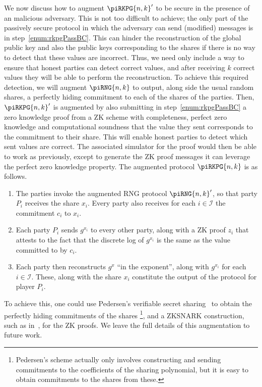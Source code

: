 \documentclass{article}
\theoremstyle{remark}
\begin{document}
We now discuss how to augment ${\piRKPG{n,k}}'$ to be secure in the presence of
an malicious adversary. This is not too difficult to achieve; the only part of
the passively secure protocol in which the adversary can send (modified)
messages is in step~\ref{enum:rkpgPassBC}. This can hinder the reconstruction
of the global public key and also the public keys corresponding to the shares
if there is no way to detect that these values are incorrect. Thus, we need
only include a way to ensure that honest parties can detect correct values, and
after receiving $k$ correct values they will be able to perform the
reconstruction.  To achieve this required detection, we will augment
$\piRNG{n,k}$ to output, along side the usual random shares, a perfectly hiding
commitment to each of the shares of the parties. Then, ${\piRKPG{n,k}}'$ is
augmented by also submitting in step~\ref{enum:rkpgPassBC} a zero knowledge
proof from a ZK scheme with completeness, perfect zero knowledge and
computational soundness that the value they sent corresponds to the commitment
to their share. This will enable honest parties to detect which sent values are
correct. The associated simulator for the proof would then be able to work as
previously, except to generate the ZK proof messages it can leverage the
perfect zero knowledge property. The augmented protocol $\piRKPG{n,k}$ is as
follows.

\begin{enumerate}
	\item The parties invoke the augmented RNG protocol ${\piRNG{n,k}}'$, so
		that party $P_i$ receives the share $x_i$. Every party also receives
		for each $i \in \mathcal{I}$ the commitment $c_i$ to $x_i$.

	\item Each party $P_i$ sends $g^{x_i}$ to every other party, along with a
		ZK proof $z_i$ that attests to the fact that the discrete log of
		$g^{x_i}$ is the same as the value committed to by $c_i$.

	\item Each party then reconstructs $g^x$ ``in the exponent'', along with
		$g^{x_i}$ for each $i \in \mathcal{I}$. These, along with the share
		$x_i$ constitute the output of the protocol for player $P_i$.
\end{enumerate}

To achieve this, one could use Pedersen's verifiable secret sharing~\cite{p91a}
to obtain the perfectly hiding commitments of the shares%
\footnote{%
	Pedersen's scheme actually only involves constructing and sending
	commitments to the coefficients of the sharing polynomial, but it is easy
	to obtain commitments to the shares from these.
},
and a ZKSNARK construction, such as in~\cite{g16}, for the ZK proofs. We leave
the full details of this augmentation to future work.
\end{document}
